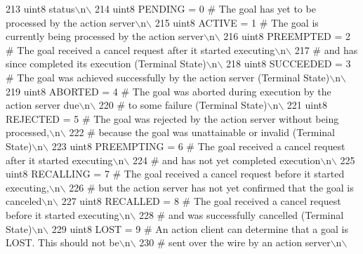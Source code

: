 \begin{DoxyCode}
213 \textcolor{stringliteral}{uint8 status\(\backslash\)n\(\backslash\)}
214 \textcolor{stringliteral}{uint8 PENDING         = 0   # The goal has yet to be processed by the action server\(\backslash\)n\(\backslash\)}
215 \textcolor{stringliteral}{uint8 ACTIVE          = 1   # The goal is currently being processed by the action server\(\backslash\)n\(\backslash\)}
216 \textcolor{stringliteral}{uint8 PREEMPTED       = 2   # The goal received a cancel request after it started executing\(\backslash\)n\(\backslash\)}
217 \textcolor{stringliteral}{                            #   and has since completed its execution (Terminal State)\(\backslash\)n\(\backslash\)}
218 \textcolor{stringliteral}{uint8 SUCCEEDED       = 3   # The goal was achieved successfully by the action server (Terminal State)\(\backslash\)n\(\backslash\)}
219 \textcolor{stringliteral}{uint8 ABORTED         = 4   # The goal was aborted during execution by the action server due\(\backslash\)n\(\backslash\)}
220 \textcolor{stringliteral}{                            #    to some failure (Terminal State)\(\backslash\)n\(\backslash\)}
221 \textcolor{stringliteral}{uint8 REJECTED        = 5   # The goal was rejected by the action server without being processed,\(\backslash\)n\(\backslash\)}
222 \textcolor{stringliteral}{                            #    because the goal was unattainable or invalid (Terminal State)\(\backslash\)n\(\backslash\)}
223 \textcolor{stringliteral}{uint8 PREEMPTING      = 6   # The goal received a cancel request after it started executing\(\backslash\)n\(\backslash\)}
224 \textcolor{stringliteral}{                            #    and has not yet completed execution\(\backslash\)n\(\backslash\)}
225 \textcolor{stringliteral}{uint8 RECALLING       = 7   # The goal received a cancel request before it started executing,\(\backslash\)n\(\backslash\)}
226 \textcolor{stringliteral}{                            #    but the action server has not yet confirmed that the goal is canceled\(\backslash\)n\(\backslash\)}
227 \textcolor{stringliteral}{uint8 RECALLED        = 8   # The goal received a cancel request before it started executing\(\backslash\)n\(\backslash\)}
228 \textcolor{stringliteral}{                            #    and was successfully cancelled (Terminal State)\(\backslash\)n\(\backslash\)}
229 \textcolor{stringliteral}{uint8 LOST            = 9   # An action client can determine that a goal is LOST. This should not be\(\backslash\)n\(\backslash\)}
230 \textcolor{stringliteral}{                            #    sent over the wire by an action server\(\backslash\)n\(\backslash\)}

\end{DoxyCode}
